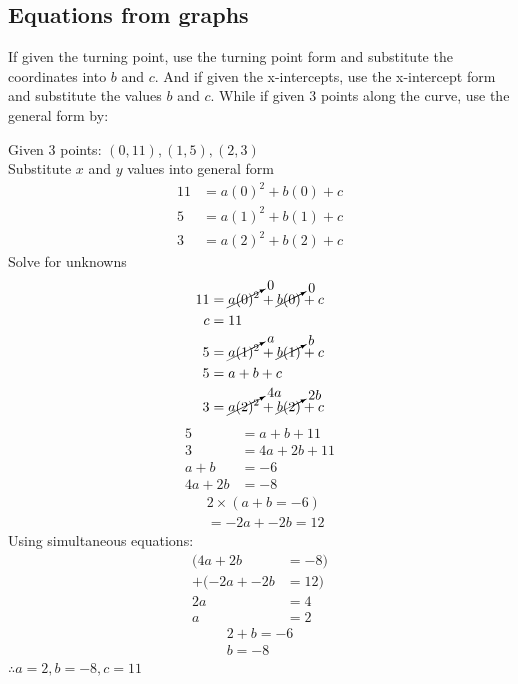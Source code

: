 \documentclass{report}
\begin{document}
\subsection{Equations from graphs}
If given the turning point, use the turning point form and substitute the coordinates into $b$ and $c$.  And if given the x-intercepts, use the x-intercept form and substitute the values $b$ and $c$.  While if given 3 points along the curve, use the general form by:\\
\begin{center}
	Given 3 points: $(0, 11), (1, 5), (2, 3)$\\
	Substitute $x$ and $y$ values into general form
	\begin{align*}
		11 & = a(0)^2 + b(0) + c \\
		5  & = a(1)^2 + b(1) + c \\
		3  & = a(2)^2 + b(2) + c
	\end{align*}
	Solve for unknowns
	\begin{align*}
		11 & = \cancelto{0}{a(0)^2} + \cancelto{0}{b(0)} + c   \\
		c  & = 11                                              \\
		5  & = \cancelto{a}{a(1)^2} + \cancelto{b}{b(1)} + c   \\
		5  & = a + b + c                                       \\
		3  & = \cancelto{4a}{a(2)^2} + \cancelto{2b}{b(2)} + c \\
	\end{align*}
	\begin{align*}
		5       & = a + b + 11   \\
		3       & = 4a + 2b + 11 \\
		a + b   & = -6           \\
		4a + 2b & = -8
	\end{align*}
	\begin{align*}
		 & 2 \times (a + b = -6) \\
		 & = -2a + -2b = 12
	\end{align*}
	Using simultaneous equations:
	\begin{align*}
		(4a + 2b     & = -8) \\
		+ (-2a + -2b & = 12) \\
		2a           & = 4   \\
		a            & = 2
	\end{align*}
	\begin{align*}
		2 + b = -6 \\
		b = -8
	\end{align*}
	$\therefore a = 2, b = -8, c = 11$
\end{center}
\end{document}
